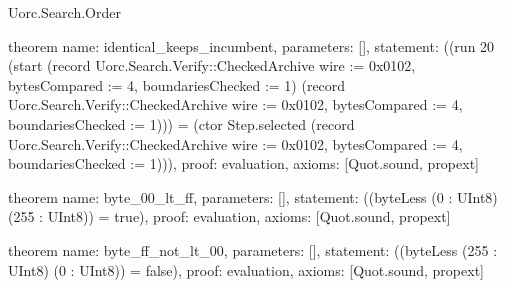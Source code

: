 \begin{lexlean}{Uorc.Search.Order}
\begin{semanticmodule}
theorem{
  name: identical_keeps_incumbent,
  parameters: [],
  statement: ((run 20 (start (record Uorc.Search.Verify::CheckedArchive {wire := 0x0102, bytesCompared := 4, boundariesChecked := 1}) (record Uorc.Search.Verify::CheckedArchive {wire := 0x0102, bytesCompared := 4, boundariesChecked := 1}))) = (ctor Step.selected (record Uorc.Search.Verify::CheckedArchive {wire := 0x0102, bytesCompared := 4, boundariesChecked := 1}))),
  proof: evaluation{},
  axioms: [Quot.sound, propext]
}

theorem{
  name: byte_00_lt_ff,
  parameters: [],
  statement: ((byteLess (0 : UInt8) (255 : UInt8)) = true),
  proof: evaluation{},
  axioms: [Quot.sound, propext]
}

theorem{
  name: byte_ff_not_lt_00,
  parameters: [],
  statement: ((byteLess (255 : UInt8) (0 : UInt8)) = false),
  proof: evaluation{},
  axioms: [Quot.sound, propext]
}
\end{semanticmodule}
\end{lexlean}
